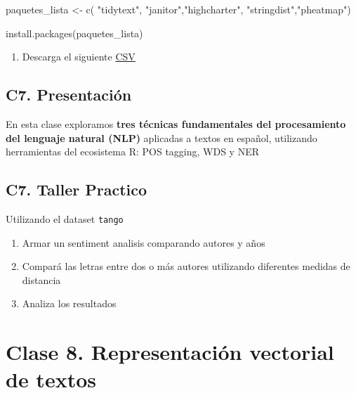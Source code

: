 \documentclass[
  letterpaper,
  DIV=11,
  numbers=noendperiod]{scrreprt}
\newenvironment{Shaded}{\begin{snugshade}}{\end{snugshade}}
\newcommand{\FunctionTok}[1]{\textcolor[rgb]{0.28,0.35,0.67}{#1}}
\newcommand{\NormalTok}[1]{\textcolor[rgb]{0.00,0.23,0.31}{#1}}
\newcommand{\OtherTok}[1]{\textcolor[rgb]{0.00,0.23,0.31}{#1}}
\newcommand{\StringTok}[1]{\textcolor[rgb]{0.13,0.47,0.30}{#1}}
\providecommand{\tightlist}{%
  \setlength{\itemsep}{0pt}\setlength{\parskip}{0pt}}
\begin{document}
\begin{Shaded}
\begin{Highlighting}[]

\NormalTok{paquetes\_lista }\OtherTok{\textless{}{-}} \FunctionTok{c}\NormalTok{(}
  \StringTok{"tidytext"}\NormalTok{, }\StringTok{"janitor"}\NormalTok{,}\StringTok{"highcharter"}\NormalTok{, }\StringTok{"stringdist"}\NormalTok{,}\StringTok{"pheatmap"}\NormalTok{)}

\FunctionTok{install.packages}\NormalTok{(paquetes\_lista)}
\end{Highlighting}
\end{Shaded}

\begin{enumerate}
\def\labelenumi{\arabic{enumi}.}
\setcounter{enumi}{1}
\tightlist
\item
  Descarga el siguiente
  \href{https://drive.google.com/file/d/1wIUQbm1EscRhhjHfTIDCQi_h63nSzY3g/view?usp=drive_link}{CSV}
\end{enumerate}

\chapter{C7. Presentación}\label{c7.-presentaciuxf3n}

En esta clase exploramos \textbf{tres técnicas fundamentales del
procesamiento del lenguaje natural (NLP)} aplicadas a textos en español,
utilizando herramientas del ecosistema R: POS tagging, WDS y NER

\chapter{C7. Taller Practico}\label{c7.-taller-practico}

Utilizando el dataset \texttt{tango}

\begin{enumerate}
\def\labelenumi{\arabic{enumi})}
\item
  Armar un sentiment analisis comparando autores y años
\item
  Compará las letras entre dos o más autores utilizando diferentes
  medidas de distancia
\item
  Analiza los resultados
\end{enumerate}

\part{Clase 8. Representación vectorial de textos }
\end{document}
